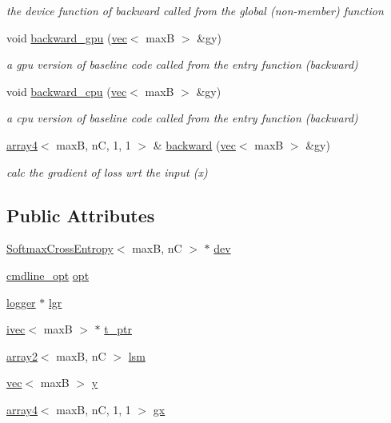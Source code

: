 \begin{DoxyCompactItemize}
\begin{DoxyCompactList}\small\item\em the device function of backward called from the global (non-\/member) function \end{DoxyCompactList}\item 
void \hyperlink{structSoftmaxCrossEntropy_a767b5a911be901ce811ffca5fb88af74}{backward\+\_\+gpu} (\hyperlink{structvec}{vec}$<$ maxB $>$ \&gy)
\begin{DoxyCompactList}\small\item\em a gpu version of baseline code called from the entry function (backward) \end{DoxyCompactList}\item 
void \hyperlink{structSoftmaxCrossEntropy_ad486637359bf83f545a00b1e29584b35}{backward\+\_\+cpu} (\hyperlink{structvec}{vec}$<$ maxB $>$ \&gy)
\begin{DoxyCompactList}\small\item\em a cpu version of baseline code called from the entry function (backward) \end{DoxyCompactList}\item 
\hyperlink{structarray4}{array4}$<$ maxB, nC, 1, 1 $>$ \& \hyperlink{structSoftmaxCrossEntropy_afb506c6159bd6cd02a6c5e8426628fe0}{backward} (\hyperlink{structvec}{vec}$<$ maxB $>$ \&gy)
\begin{DoxyCompactList}\small\item\em calc the gradient of loss wrt the input (x) \end{DoxyCompactList}\end{DoxyCompactItemize}
\subsection*{Public Attributes}
\begin{DoxyCompactItemize}
\item 
\hyperlink{structSoftmaxCrossEntropy}{Softmax\+Cross\+Entropy}$<$ maxB, nC $>$ $\ast$ \hyperlink{structSoftmaxCrossEntropy_a5a1e252b71ec4a89577e908abe7e723e}{dev}
\item 
\hyperlink{structcmdline__opt}{cmdline\+\_\+opt} \hyperlink{structSoftmaxCrossEntropy_a5b1fcafb5b11b7c6c09c228fb442a888}{opt}
\item 
\hyperlink{structlogger}{logger} $\ast$ \hyperlink{structSoftmaxCrossEntropy_a10a76ce6a1cd3e1d1a57c0f2ba42f5a0}{lgr}
\item 
\hyperlink{structivec}{ivec}$<$ maxB $>$ $\ast$ \hyperlink{structSoftmaxCrossEntropy_a58fadb0af31e34384df054ab40b88201}{t\+\_\+ptr}
\item 
\hyperlink{structarray2}{array2}$<$ maxB, nC $>$ \hyperlink{structSoftmaxCrossEntropy_a52f15cc4720bbc8f7550577726492e99}{lsm}
\item 
\hyperlink{structvec}{vec}$<$ maxB $>$ \hyperlink{structSoftmaxCrossEntropy_a375b984851163f54de4196a385c6d8e6}{y}
\item 
\hyperlink{structarray4}{array4}$<$ maxB, nC, 1, 1 $>$ \hyperlink{structSoftmaxCrossEntropy_abc18b5561486ac3855176b6a74e1726b}{gx}
\end{DoxyCompactItemize}


